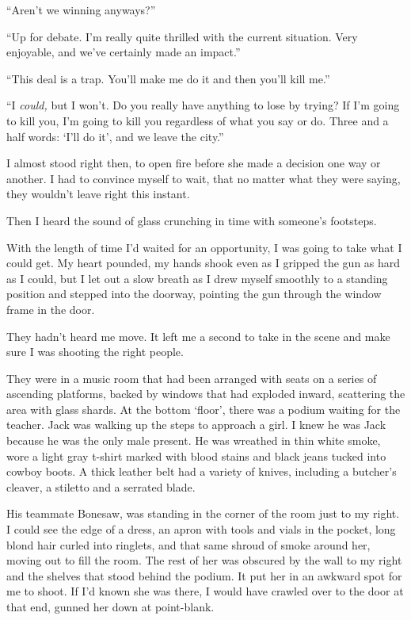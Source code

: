 ``Aren't we winning anyways?''



``Up for debate.  I'm really quite thrilled with the current situation.  Very enjoyable, and we've certainly made an impact.''



``This deal is a trap.  You'll make me do it and then you'll kill me.''



``I \emph{could, }but I won't.  Do you really have anything to lose by trying?  If I'm going to kill you, I'm going to kill you regardless of what you say or do.  Three and a half words: `I'll do it', and we leave the city.''



I almost stood right then, to open fire before she made a decision one way or another.  I had to convince myself to wait, that no matter what they were saying, they wouldn't leave right this instant.



Then I heard the sound of glass crunching in time with someone's footsteps.



With the length of time I'd waited for an opportunity, I was going to take what I could get.  My heart pounded, my hands shook even as I gripped the gun as hard as I could, but I let out a slow breath as I drew myself smoothly to a standing position and stepped into the doorway, pointing the gun through the window frame in the door.



They hadn't heard me move.  It left me a second to take in the scene and make sure I was shooting the right people.



They were in a music room that had been arranged with seats on a series of ascending platforms, backed by windows that had exploded inward, scattering the area with glass shards.  At the bottom `floor', there was a podium waiting for the teacher.  Jack was walking up the steps to approach a girl.  I knew he was Jack because he was the only male present.  He was wreathed in thin white smoke, wore a light gray t-shirt marked with blood stains and black jeans tucked into cowboy boots.  A thick leather belt had a variety of knives, including a butcher's cleaver, a stiletto and a serrated blade.



His teammate Bonesaw, was standing in the corner of the room just to my right.  I could see the edge of a dress, an apron with tools and vials in the pocket, long blond hair curled into ringlets, and that same shroud of smoke around her, moving out to fill the room.  The rest of her was obscured by the wall to my right and the shelves that stood behind the podium.  It put her in an awkward spot for me to shoot.  If I'd known she was there, I would have crawled over to the door at that end, gunned her down at point-blank.



